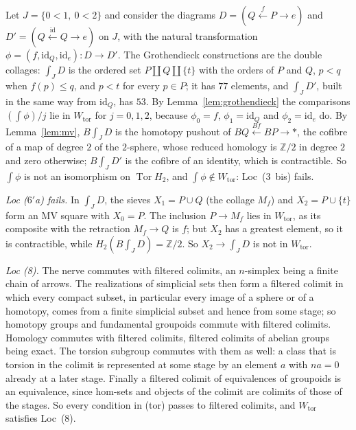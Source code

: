\documentclass[11pt,a4paper]{article}
\theoremstyle{definition}
\newcommand{\Wtor}{W_{\mathrm{tor}}}
\newcommand{\Tor}{\operatorname{Tor}}
\newcommand{\Z}{\mathbb{Z}}
\newcommand{\id}{\mathrm{id}}
\begin{document}
Let $J=\{0<1,\ 0<2\}$ and consider the diagrams $D=(Q\xleftarrow{f}P\to e)$ and
$D'=(Q\xleftarrow{\id}Q\to e)$ on $J$, with the natural transformation
$\phi=(f,\id_Q,\id_e)\colon D\to D'$. The Grothendieck constructions are the double
collages: $\int_JD$ is the ordered set $P\amalg Q\amalg\{t\}$ with the orders of $P$ and $Q$,
$p<q$ when $f(p)\le q$, and $p<t$ for every $p\in P$; it has $77$ elements, and $\int_JD'$,
built in the same way from $\id_Q$, has $53$. By Lemma~\ref{lem:grothendieck} the comparisons
$(\int\phi)/j$ lie in $\Wtor$ for $j=0,1,2$, because $\phi_0=f$, $\phi_1=\id_Q$ and
$\phi_2=\id_e$ do. By Lemma~\ref{lem:mv}, $B\int_JD$ is the homotopy pushout of
$BQ\xleftarrow{Bf}BP\to\ast$, the cofibre of a map of degree $2$ of the $2$-sphere, whose
reduced homology is $\Z/2$ in degree $2$ and zero otherwise; $B\int_JD'$ is the cofibre of an
identity, which is contractible. So $\int\phi$ is not an isomorphism on $\Tor H_2$, and
$\int\phi\notin\Wtor$: Loc~(3~bis) fails.

\emph{Loc ($6'$a) fails.} In $\int_JD$, the sieves $X_1=P\cup Q$ (the collage $M_f$) and
$X_2=P\cup\{t\}$ form an MV square with $X_0=P$. The inclusion $P\to M_f$ lies in $\Wtor$, as
its composite with the retraction $M_f\to Q$ is $f$; but $X_2$ has a greatest element, so it is
contractible, while $H_2(B\int_JD)=\Z/2$. So $X_2\to\int_JD$ is not in $\Wtor$.

\emph{Loc (8).} The nerve commutes with filtered colimits, an $n$-simplex being a finite chain of
arrows. The realizations of simplicial sets then form a filtered colimit in which every compact
subset, in particular every image of a sphere or of a homotopy, comes from a finite simplicial
subset and hence from some stage; so homotopy groups and fundamental groupoids commute with
filtered colimits. Homology commutes with filtered colimits, filtered colimits of abelian groups
being exact. The torsion subgroup commutes with them as well: a class that is torsion in the
colimit is represented at some stage by an element $a$ with $na=0$ already at a later stage.
Finally a filtered colimit of equivalences of groupoids is an equivalence, since hom-sets and
objects of the colimit are colimits of those of the stages. So every condition in (tor) passes to
filtered colimits, and $\Wtor$ satisfies Loc~(8).
\end{document}
